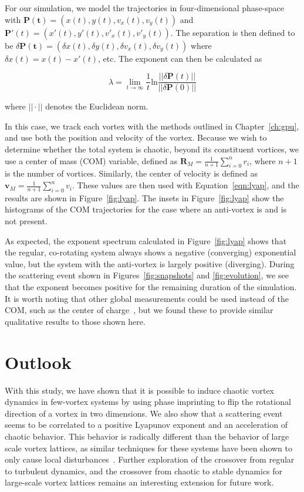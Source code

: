 For our simulation, we model the trajectories in four-dimensional phase-space with $\mathbf{P(t)} = (x(t), y(t), v_x(t), v_y(t))$ and $\mathbf{P}'(t) = (x'(t), y'(t), v'_x(t), v'_y(t))$.
The separation is then defined to be $\delta \mathbf{P(t)} = (\delta x(t), \delta y(t), \delta v_x(t), \delta v_y(t))$ where $\delta x(t) = x(t) - x'(t)$, etc.
The exponent can then be calculated as

\begin{equation}
\lambda = \lim_{t\to\infty}\frac{1}{t}\text{ln}\frac{||\delta\textbf{P}(t)||}{||\delta\textbf{P}(0)||}
\label{eqn:lyap}
\end{equation}

\noindent where $||\cdot||$ denotes the Euclidean norm.

In this case, we track each vortex with the methods outlined in Chapter~\ref{ch:gpu}, and use both the position and velocity of the vortex.
Because we wish to determine whether the total system is chaotic, beyond its constituent vortices, we use a center of mass (COM) variable, defined as $\mathbf{R}_M = \frac{1}{n+1}\sum_{i=0}^nr_i$, where $n+1$ is the number of vortices.
Similarly, the center of velocity is defined as $\mathbf{v}_M = \frac{1}{n+1}\sum_{i=0}^nv_i$.
These values are then used with Equation~\eqref{eqn:lyap}, and the results are shown in Figure~\ref{fig:lyap}.
The insets in Figure~\ref{fig:lyap} show the histograms of the COM trajectories for the case where an anti-vortex is and is not present.

As expected, the exponent spectrum calculated in Figure~\ref{fig:lyap} shows that the regular, co-rotating system always shows a negative (converging) exponential value, but the system with the anti-vortex is largely positive (diverging).
During the scattering event shown in Figures~\ref{fig:snapshots} and \ref{fig:evolution}, we see that the exponent becomes positive for the remaining duration of the simulation.
It is worth noting that other global measurements could be used instead of the COM, such as the center of charge~\cite{kyriakopoulos2014}, but we found these to provide similar qualitative results to those shown here.


\section{Outlook}

With this study, we have shown that it is possible to induce chaotic vortex dynamics in few-vortex systems by using phase imprinting to flip the rotational direction of a vortex in two dimensions.
We also show that a scattering event seems to be correlated to a positive Lyapunov exponent and an acceleration of chaotic behavior.
This behavior is radically different than the behavior of large scale vortex lattices, as similar techniques for these systems have been shown to only cause local disturbances~\cite{o2016topo}.
Further exploration of the crossover from regular to turbulent dynamics, and the crossover from chaotic to stable dynamics for large-scale vortex lattices remains an interesting extension for future work.

